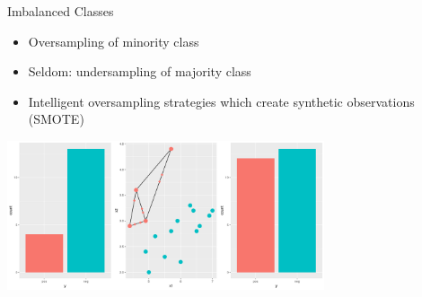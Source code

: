 	
	\begin{frame}{Imbalanced Classes}
		\begin{itemize}
			\item Oversampling of minority class
			\item Seldom: undersampling of majority class
			\item Intelligent oversampling strategies which create
			synthetic observations (SMOTE) 
		\end{itemize}
		\begin{center}
			\includegraphics[width= 0.7\textwidth]{images/smote.png}
		\end{center}
	\end{frame}
	
	
	

